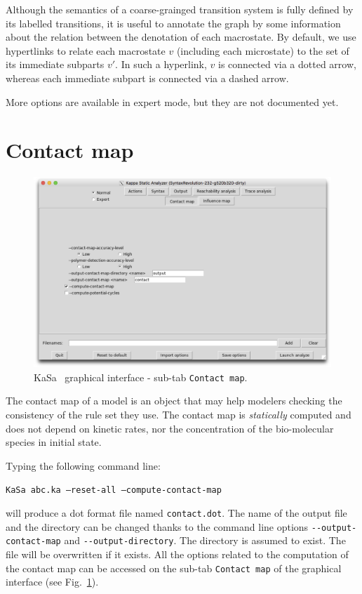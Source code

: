 \documentclass[11pt]{book}
\def\KaSa{\textsf{KaSa}}
\begin{document}
Although the semantics of a coarse-grainged transition system is fully defined  by its labelled transitions, it is useful to annotate the graph by some information about the relation between the denotation of each macrostate. By default, we use hypertlinks to relate each macrostate $v$ (including each microstate)
 to the set of its immediate subparts $v'$. In such a hyperlink, $v$ is connected via a dotted arrow, whereas each immediate subpart is connected via a dashed arrow.

 More options are available in expert mode, but they are not documented yet.

\section{Contact map}

\begin{figure}[h]
\centering
\includegraphics[width=12cm]{img/kasa_5.png}
\caption{\KaSa~ graphical interface - sub-tab \texttt{Contact map}.}
\label{fig:kasa:4}
\end{figure}

The contact map of a model is an object that may help modelers checking the consistency of the rule set they use. The contact map is \emph{statically} computed and does not depend on kinetic rates, nor the concentration of the bio-molecular species in initial state.


Typing the following command line:

\texttt{KaSa abc.ka --reset-all --compute-contact-map}

will produce a dot format file named \texttt{contact.dot}.
The name of the output file and the directory can be changed thanks to the command line options \texttt{-{}-output-contact-map} and \texttt{-{}-output-directory}.
The directory is assumed to exist. The file will be overwritten if it exists. All the options related to the computation of the contact map can be accessed on the
sub-tab \texttt{Contact map} of the graphical interface (see Fig.~\ref{fig:kasa:4}).
\end{document}
